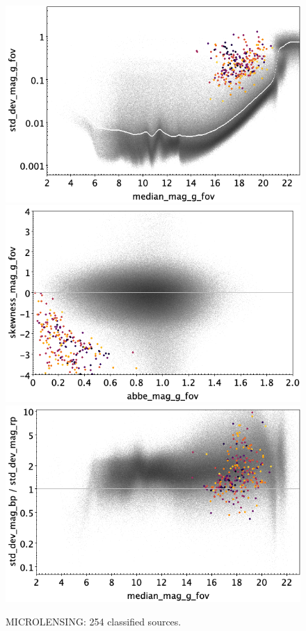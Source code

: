 \documentclass[longauth]{aa}
\begin{document}
\begin{appendix}
\begin{figure}
\hspace{2mm}
 \includegraphics[width=0.45\hsize]{figures/appendix/MICROLENSING_cls_msd.png} \\ %
\vspace{4mm}
 \includegraphics[width=0.45\hsize]{figures/appendix/MICROLENSING_cls_ask.png}  %
\hspace{2mm}
 \includegraphics[width=0.45\hsize]{figures/appendix/MICROLENSING_cls_msdr.png}  \\ %
\vspace{4mm}
 \caption{MICROLENSING: 254 classified sources.}  
 \label{fig:app:MICROLENSING}
\end{figure}


\end{appendix}
\end{document}
